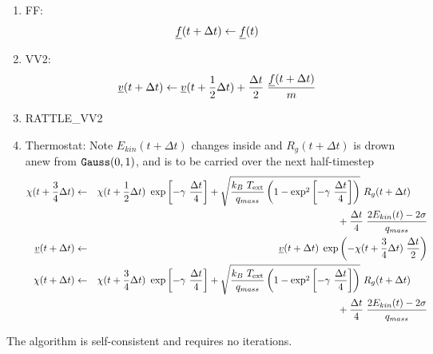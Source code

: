 \begin{enumerate}
\item FF:
\begin{equation}
\mbox{$\underline{f}$}(t + \Delta t) \leftarrow \mbox{$\underline{f}$}(t)
\end{equation}
\item VV2:
\begin{equation}
\mbox{$\underline{v}$}(t + \Delta t) \leftarrow \mbox{$\underline{v}$}(t + {1 \over 2} \Delta t) +
{\Delta t \over 2} \; {\mbox{$\underline{f}$}(t + \Delta t) \over m}
\end{equation}
\item RATTLE\_VV2
\item Thermostat: Note $E_{kin}(t + \Delta t)$ changes inside and $R_{g}(t + \Delta t)$ is drown anew from ${\tt Gauss}(0,1)$, and is to be carried over the next half-timestep
\begin{eqnarray}
\chi (t + {3 \over 4} \Delta t) &\leftarrow& \chi (t + {1 \over 2} \Delta t) ~ \exp \left[-\gamma~{\Delta t \over 4} \right] +
\sqrt{\frac{k_{B}~T_{\rm ext}}{q_{mass}}\left(1-\exp^{2} \left[-\gamma~{\Delta t \over 4} \right]\right)}~R_{g}(t + \Delta t) \phantom{xxx} \nonumber \\
& &\phantom{xxxxxxxxxxxxxxxx} + {\Delta t \over 4} \; {{2 E_{kin}(t) - 2 \sigma} \over q_{mass}} \nonumber \\
\mbox{$\underline{v}$}(t + \Delta t) &\leftarrow& \mbox{$\underline{v}$}(t + \Delta t) \; \exp \left(
-\chi (t + {3 \over 4} \Delta t) \; {\Delta t \over 2} \right) \\
\chi (t + \Delta t) &\leftarrow& \chi (t + {3 \over 4} \Delta t) ~ \exp \left[-\gamma~{\Delta t \over 4} \right] +
\sqrt{\frac{k_{B}~T_{\rm ext}}{q_{mass}}\left(1-\exp^{2} \left[-\gamma~{\Delta t \over 4} \right]\right)}~R_{g}(t + \Delta t) \phantom{xxx} \nonumber \\
& &\phantom{xxxxxxxxxxxxxxxx} + {\Delta t \over 4} \; {{2 E_{kin}(t) - 2 \sigma} \over q_{mass}} \nonumber
\end{eqnarray}
\end{enumerate}
The algorithm is self-consistent and requires no iterations.


